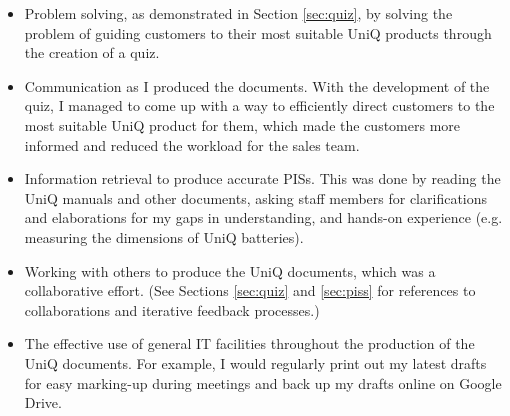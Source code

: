 \begin{itemize}
    \item Problem solving, as demonstrated in Section \ref{sec:quiz}, by solving the problem of guiding customers to their most suitable UniQ products through the creation of a quiz.
    
    \item Communication as I produced the documents.
    With the development of the quiz, I managed to come up with a way to efficiently direct customers to the most suitable UniQ product for them, which made the customers more informed and reduced the workload for the sales team.
    
    \item Information retrieval to produce accurate PISs.
    This was done by reading the UniQ manuals and other documents, asking staff members for clarifications and elaborations for my gaps in understanding, and hands-on experience (e.g. measuring the dimensions of UniQ batteries).
    
    \item Working with others to produce the UniQ documents, which was a collaborative effort.
    (See Sections \ref{sec:quiz} and \ref{sec:piss} for references to collaborations and iterative feedback processes.)
    
    \item The effective use of general IT facilities throughout the production of the UniQ documents.
    For example, I would regularly print out my latest drafts for easy marking-up during meetings and back up my drafts online on Google Drive.
\end{itemize}


